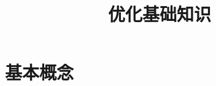



\title[Optimization Basics]{\LARGE \bfseries \quad 优化基础知识} %
\date{}






\begin{frame}

\titlepage %

\end{frame}




\section{基本概念}



